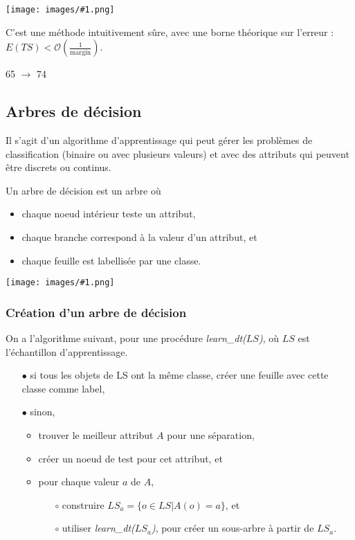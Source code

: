 \documentclass[10pt,a4paper]{report}
\newcommand{\ens}[1]{\lbrace #1 \rbrace}
\newcommand{\dessin}[1]{\begin{center}\texttt{[image: images/\#1.png]}\end{center}}
\begin{document}
		\dessin{15}
		
		C'est une méthode intuitivement sûre, avec une borne théorique sur l'erreur : $E(TS) < \mathcal{O}(\frac{1}{\text{margin}})$.
		
		65 $\rightarrow$ 74
		
		\subsection{Arbres de décision}
		
		Il s'agit d'un algorithme d'apprentissage qui peut gérer les problèmes de classification (binaire ou avec plusieurs valeurs) et avec des attributs qui peuvent être discrets ou continus.
		
		Un arbre de décision est un arbre où
		
		\begin{itemize}
			\item chaque noeud intérieur teste un attribut,
			\item chaque branche correspond à la valeur d'un attribut, et
			\item chaque feuille est labellisée par une classe.
		\end{itemize}
		
		\dessin{16}
		
			\subsubsection{Création d'un arbre de décision}
			
			On a l'algorithme suivant, pour une procédure \textit{learn\_dt($LS$)}, où $LS$ est l'échantillon d'apprentissage.
			
			\begin{itemize}
				\item[$\bullet$] si tous les objets de LS ont la même classe, créer une feuille avec cette classe comme label,
				\item[$\bullet$] sinon,
				\begin{itemize}
					\item trouver le meilleur attribut $A$ pour une séparation,
					\item créer un noeud de test pour cet attribut, et
					\item pour chaque valeur $a$ de $A$,
					\begin{itemize}
						\item[$\circ$] construire $LS_a = \ens{o \in LS \vert A(o) = a}$, et
						\item[$\circ$] utiliser \textit{learn\_dt($LS_a$)}, pour créer un sous-arbre à partir de $LS_a$.
					\end{itemize}
				\end{itemize}
			\end{itemize}
			
\end{document}
